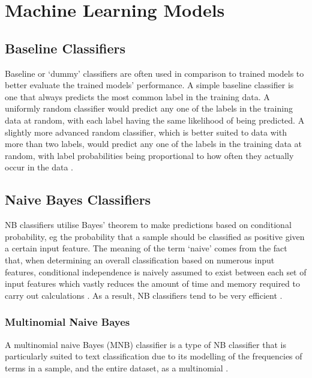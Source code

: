 \section{Machine Learning Models} \label{sec:TBG_ML}

\subsection{Baseline Classifiers} \label{sec:TBG_ML_BLC}

Baseline or `dummy' classifiers are often used in comparison to trained models to better evaluate the trained models' performance. A simple baseline classifier is one that always predicts the most common label in the training data. A uniformly random classifier would predict any one of the labels in the training data at random, with each label having the same likelihood of being predicted. A slightly more advanced random classifier, which is better suited to data with more than two labels, would predict any one of the labels in the training data at random, with label probabilities being proportional to how often they actually occur in the data \cite{pedregosa2011scikit}.

\subsection{Naive Bayes Classifiers} \label{sec:TBG_NB}

NB classifiers utilise Bayes' theorem to make predictions based on conditional probability, eg the probability that a sample should be classified as positive given a certain input feature. The meaning of the term `naive' comes from the fact that, when determining an overall classification based on numerous input features, conditional independence is naively assumed to exist between each set of input features which vastly reduces the amount of time and memory required to carry out calculations \cite{dangeti2017statistics}. As a result, NB classifiers tend to be very efficient \cite{pedregosa2011scikit}.

\subsubsection{Multinomial Naive Bayes}

A multinomial naive Bayes (MNB) classifier is a type of NB classifier that is particularly suited to text classification due to its modelling of the frequencies of terms in a sample, and the entire dataset, as a multinomial \cite{rennie2003tackling}.

